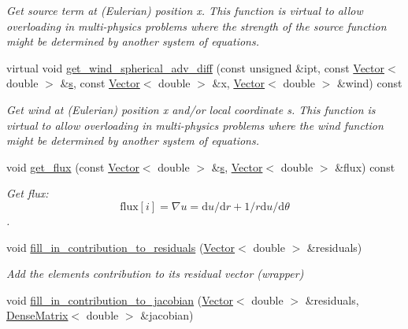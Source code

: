 \begin{DoxyCompactItemize}
\begin{DoxyCompactList}\small\item\em Get source term at (Eulerian) position x. This function is virtual to allow overloading in multi-\/physics problems where the strength of the source function might be determined by another system of equations. \end{DoxyCompactList}\item 
virtual void \hyperlink{classoomph_1_1SphericalAdvectionDiffusionEquations_afbea24565ef0db2546b804233a114a86}{get\+\_\+wind\+\_\+spherical\+\_\+adv\+\_\+diff} (const unsigned \&ipt, const \hyperlink{classoomph_1_1Vector}{Vector}$<$ double $>$ \&\hyperlink{cfortran_8h_ab7123126e4885ef647dd9c6e3807a21c}{s}, const \hyperlink{classoomph_1_1Vector}{Vector}$<$ double $>$ \&x, \hyperlink{classoomph_1_1Vector}{Vector}$<$ double $>$ \&wind) const
\begin{DoxyCompactList}\small\item\em Get wind at (Eulerian) position x and/or local coordinate s. This function is virtual to allow overloading in multi-\/physics problems where the wind function might be determined by another system of equations. \end{DoxyCompactList}\item 
void \hyperlink{classoomph_1_1SphericalAdvectionDiffusionEquations_a52e4a713aa779de8cd57ec5faa60a709}{get\+\_\+flux} (const \hyperlink{classoomph_1_1Vector}{Vector}$<$ double $>$ \&\hyperlink{cfortran_8h_ab7123126e4885ef647dd9c6e3807a21c}{s}, \hyperlink{classoomph_1_1Vector}{Vector}$<$ double $>$ \&flux) const
\begin{DoxyCompactList}\small\item\em Get flux\+: \[ \mbox{flux}[i] = \nabla u = \mbox{d}u / \mbox{d} r + 1/r \mbox{d}u / \mbox{d} \theta \]. \end{DoxyCompactList}\item 
void \hyperlink{classoomph_1_1SphericalAdvectionDiffusionEquations_a57068b61f67c6aa99f3339cf852fa696}{fill\+\_\+in\+\_\+contribution\+\_\+to\+\_\+residuals} (\hyperlink{classoomph_1_1Vector}{Vector}$<$ double $>$ \&residuals)
\begin{DoxyCompactList}\small\item\em Add the element\textquotesingle{}s contribution to its residual vector (wrapper) \end{DoxyCompactList}\item 
void \hyperlink{classoomph_1_1SphericalAdvectionDiffusionEquations_a9ed67207accc327c4d2bf614c4c452e0}{fill\+\_\+in\+\_\+contribution\+\_\+to\+\_\+jacobian} (\hyperlink{classoomph_1_1Vector}{Vector}$<$ double $>$ \&residuals, \hyperlink{classoomph_1_1DenseMatrix}{Dense\+Matrix}$<$ double $>$ \&jacobian)

\end{DoxyCompactItemize}

